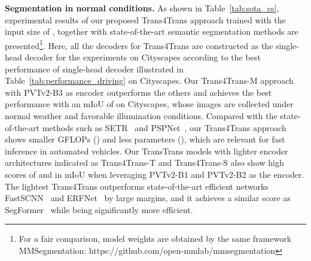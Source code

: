 \documentclass[journal]{IEEEtran}
\begin{document}
\noindent\textbf{Segmentation in normal conditions.}
As shown in Table~\ref{tab:sota_cs}, experimental results of our proposed Trans4Trans approach trained with the input size of , together with state-of-the-art semantic segmentation methods are presented\footnote[1]{For a fair comparison, model weights are obtained by the same framework MMSegmentation: https://github.com/open-mmlab/mmsegmentation}. Here, all the decoders for Trans4Trans are constructed as the single-head decoder for the experiments on Cityscapes according to the best performance of single-head decoder illustrated in Table~\ref{tab:performance_driving} on Cityscapes. Our Trans4Trans-M approach with PVTv2-B3 as encoder outperforms the others and achieves the best performance with an mIoU of  on Cityscapes, whose images are collected under normal weather and favorable illumination conditions. Compared with the state-of-the-art methods such as SETR~\cite{setr} and PSPNet~\cite{pspnet}, our Trans4Trans approach shows smaller GFLOPs () and less parameters (), which are relevant for fast inference in automated vehicles. Our TransTrans models with lighter encoder architectures indicated as Trans4Trans-T and Trans4Trans-S also show high scores of  and  in mIoU when leveraging PVTv2-B1 and PVTv2-B2 as the encoder. The lightest Trans4Trans outperforms state-of-the-art efficient networks FastSCNN~\cite{fastscnn} and ERFNet~\cite{romera2017erfnet} by large margins, and it achieves a similar score as SegFormer~\cite{segformer} while being significantly more efficient. 
\end{document}
